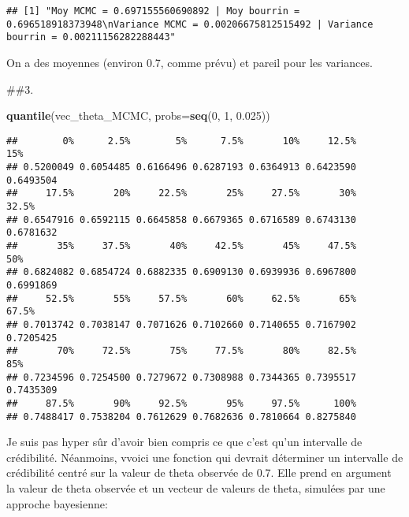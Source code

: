 \documentclass[]{article}
\newenvironment{Shaded}{\begin{snugshade}}{\end{snugshade}}
\newcommand{\DataTypeTok}[1]{\textcolor[rgb]{0.13,0.29,0.53}{#1}}
\newcommand{\DecValTok}[1]{\textcolor[rgb]{0.00,0.00,0.81}{#1}}
\newcommand{\FloatTok}[1]{\textcolor[rgb]{0.00,0.00,0.81}{#1}}
\newcommand{\KeywordTok}[1]{\textcolor[rgb]{0.13,0.29,0.53}{\textbf{#1}}}
\newcommand{\NormalTok}[1]{#1}
\begin{document}
\begin{verbatim}
## [1] "Moy MCMC = 0.697155560690892 | Moy bourrin = 0.696518918373948\nVariance MCMC = 0.00206675812515492 | Variance bourrin = 0.00211156282288443"
\end{verbatim}

On a des moyennes (environ 0.7, comme prévu) et pareil pour les
variances.

\#\#3.

\begin{Shaded}
\begin{Highlighting}[]
\KeywordTok{quantile}\NormalTok{(vec_theta_MCMC, }\DataTypeTok{probs=}\KeywordTok{seq}\NormalTok{(}\DecValTok{0}\NormalTok{, }\DecValTok{1}\NormalTok{, }\FloatTok{0.025}\NormalTok{))}
\end{Highlighting}
\end{Shaded}

\begin{verbatim}
##        0%      2.5%        5%      7.5%       10%     12.5%       15% 
## 0.5200049 0.6054485 0.6166496 0.6287193 0.6364913 0.6423590 0.6493504 
##     17.5%       20%     22.5%       25%     27.5%       30%     32.5% 
## 0.6547916 0.6592115 0.6645858 0.6679365 0.6716589 0.6743130 0.6781632 
##       35%     37.5%       40%     42.5%       45%     47.5%       50% 
## 0.6824082 0.6854724 0.6882335 0.6909130 0.6939936 0.6967800 0.6991869 
##     52.5%       55%     57.5%       60%     62.5%       65%     67.5% 
## 0.7013742 0.7038147 0.7071626 0.7102660 0.7140655 0.7167902 0.7205425 
##       70%     72.5%       75%     77.5%       80%     82.5%       85% 
## 0.7234596 0.7254500 0.7279672 0.7308988 0.7344365 0.7395517 0.7435309 
##     87.5%       90%     92.5%       95%     97.5%      100% 
## 0.7488417 0.7538204 0.7612629 0.7682636 0.7810664 0.8275840
\end{verbatim}

Je suis pas hyper sûr d'avoir bien compris ce que c'est qu'un intervalle
de crédibilité. Néanmoins, vvoici une fonction qui devrait déterminer un
intervalle de crédibilité centré sur la valeur de theta observée de 0.7.
Elle prend en argument la valeur de theta observée et un vecteur de
valeurs de theta, simulées par une approche bayesienne:
\end{document}

